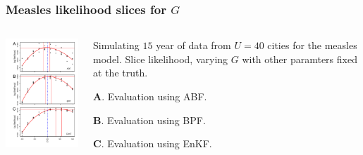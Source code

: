 \documentclass{beamer}
\begin{document}
\begin{frame}

\frametitle{Measles likelihood slices for $G$}

\vspace{-5mm}

\begin{columns}[T] %
\begin{column}{.55\textwidth}
  \includegraphics[width=6cm]{slice_combined_plot-1.pdf}
\end{column}
\begin{column}{.52\textwidth}

  \vspace{6mm}
  
  Simulating $15$ year of data from $U=40$ cities for the measles model.
  Slice likelihood, varying $G$ with other paramters fixed at the truth.

  \vspace{7mm}

  {\bf A}. Evaluation using ABF.

    \vspace{4mm}

  {\bf B}. Evaluation using BPF.

    \vspace{4mm}

  {\bf C}. Evaluation using EnKF.

  
\end{column}
\end{columns}

\end{frame}
\end{document}
